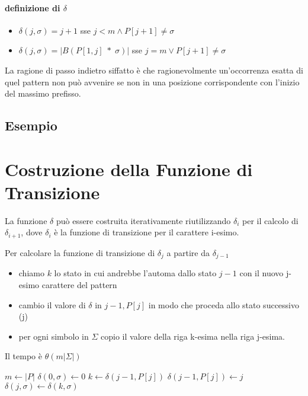 \paragraph{definizione di $\delta$}

\begin{itemize}
    \item $\delta(j, \sigma) = j+1$ sse $j < m \land P[j+1] \neq \sigma$
    \item $\delta(j, \sigma) = |B(P[1,j]\;\ast\;\sigma)|$ sse $j = m \lor P[j+1] \neq \sigma$
\end{itemize}

La ragione di passo indietro siffatto \`e che ragionevolmente un'occorrenza esatta di quel pattern non pu\`o avvenire se non in una posizione corrispondente con l'inizio del massimo prefisso.

\subsection{Esempio}


\section{Costruzione della Funzione di Transizione}

La funzione $\delta$ pu\`o essere costruita iterativamente riutilizzando $\delta_i$ per il calcolo di $\delta_{i+1}$, dove $\delta_i$ \`e la funzione di transizione per il carattere i-esimo.

Per calcolare la funzione di transizione di $\delta_j$ a partire da $\delta_{j-1}$
\begin{itemize}
    \item chiamo $k$ lo stato in cui andrebbe l'automa dallo stato $j-1$ con il nuovo j-esimo carattere del pattern
    \item cambio il valore di $\delta$ in $j-1,P[j]$ in modo che proceda allo stato successivo (j)
    \item per ogni simbolo in $\Sigma$ copio il valore della riga k-esima nella riga j-esima.
\end{itemize}

Il tempo \`e $\theta(m|\Sigma|)$

\begin{algorithm}
    \begin{algorithmic}
            \State $m \gets |P|$
            \For{$\sigma \in \Sigma$}
                \State $\delta(0, \sigma) \gets 0$
            \EndFor
                \State $k \gets \delta(j-1, P[j])$
                \State $\delta(j-1, P[j]) \gets j$
                \For{$\sigma \in \Sigma$}
                    \State $\delta(j, \sigma) \gets \delta(k, \sigma)$
                \EndFor
            \EndFor
        \EndProcedure
    \end{algorithmic}
\end{algorithm}

